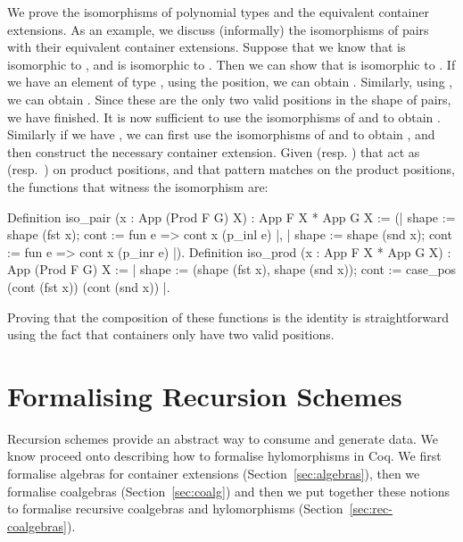 \documentclass[ a4paper, UKenglish, cleveref, autoref, thm-restate]{lipics-v2021}
\begin{document}
We prove the isomorphisms of polynomial types and the equivalent 
container extensions. As an example, we discuss (informally) the isomorphisms
of pairs with their equivalent container extensions. Suppose that we
know that  is isomorphic to , and
 is isomorphic to . Then we can
show that  is isomorphic to
.  If we have an element of type 
,
using the  position, we can obtain
.  Similarly, using , we can
obtain . Since these are the only two valid positions
in the shape of pairs, we have finished. It is now sufficient to use the
isomorphisms of  and  to
obtain . Similarly if we have ,
we can first use the isomorphisms of 
 and
 to obtain
, and then construct the necessary container
extension. Given  (resp. ) that
act as  (resp.\ ) on product positions, and
 that pattern
matches on the product positions, the functions that witness the isomorphism
are:
\begin{coqcode}
Definition iso_pair (x : App (Prod F G) X) : App F X * App G X :=
  ({| shape := shape (fst x); cont := fun e => cont x (p_inl e) |}, 
   {| shape := shape (snd x); cont := fun e => cont x (p_inr e) |}).
Definition iso_prod (x : App F X * App G X) : App (Prod F G) X :=
{| shape := (shape (fst x), shape (snd x));
   cont := case_pos (cont (fst x)) (cont (snd x)) |}.
\end{coqcode}
Proving that the composition of these functions is the identity is
straightforward using the fact that  containers only have two valid
positions.

\section{Formalising Recursion Schemes}
Recursion schemes provide an abstract way to consume and generate data. We know
proceed onto describing how to formalise hylomorphisms in Coq. We first
formalise algebras for container extensions (Section~\ref{sec:algebras}), then
we formalise coalgebras (Section~\ref{sec:coalg}) and then we put together
these notions to formalise recursive coalgebras and hylomorphisms
(Section~\ref{sec:rec-coalgebras}).
\end{document}
